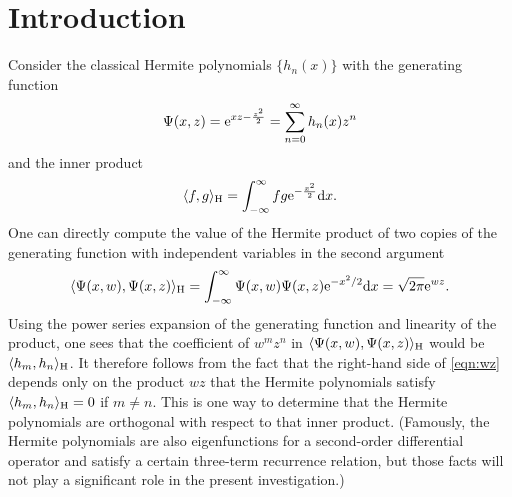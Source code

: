\documentclass[pdftex]{sigma}
\numberwithin{equation}{section}
\theoremstyle{definition}
\begin{document}


\section{Introduction}


Consider the classical Hermite polynomials $\{h_n(x)\}$ with the generating function
\[
\Psi(x,z)={\rm e}^{xz-\frac{z^2}{2}}=\sum_{n=0}^{\infty} h_n(x)z^n
\]
and the inner product
\[
\langle f,g\rangle_{\rm H}=\int_{-\infty}^{\infty} f\relax{g}{\rm e}^{-\frac{x^2}{2}}{\rm d}x.\]
One can directly compute
 the value of the Hermite product of two copies of the generating function with
independent variables in the second argument
\begin{equation}\label{eqn:wz}
\langle \Psi(x,w),\Psi(x,z)\rangle_{\rm H}=\int_{-\infty}^{\infty} \Psi(x,w)\relax{\Psi(x,z)}{\rm e}^{-x^2/2}{\rm d}x=\sqrt{2\pi}{\rm e}^{wz}.
\end{equation}
Using the power series expansion of the generating function and
linearity of the product, one sees that the coefficient of $w^mz^n$ in $\langle
\Psi(x,w),\Psi(x,z)\rangle_{\rm H}$ would be $\langle h_m,h_n\rangle_{\rm H}$.
It therefore follows from the fact that the right-hand side of \eqref{eqn:wz}
 depends only on the product $wz$ that the Hermite polynomials satisfy
 $\langle h_m,h_n\rangle_{\rm H}=0$ if $m\not=n$. This is one way to
 determine that the Hermite polynomials are orthogonal with respect to
 that inner product.
(Famously,
 the Hermite polynomials are also eigenfunctions for a second-order
 differential operator and satisfy a certain three-term recurrence
 relation, but those facts will not play a significant role in the present investigation.)
\end{document}
